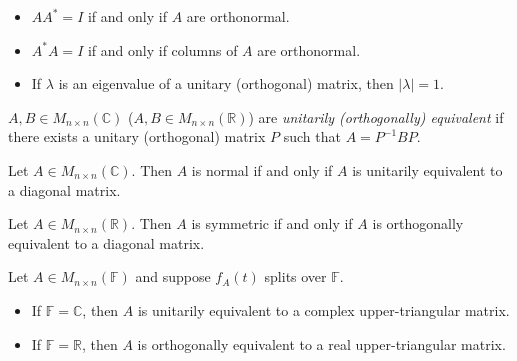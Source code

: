 \documentclass[12pt]{article}
\newenvironment{theorem}[2][Theorem]{\begin{trivlist}
\item[\hskip \labelsep {\bfseries #1}\hskip \labelsep {\bfseries #2.}]}{\end{trivlist}}
\newenvironment{definition}[2][Definition]{\begin{trivlist}
\item[\hskip \labelsep {\bfseries #1}\hskip \labelsep {\bfseries #2}]}{\end{trivlist}}
\begin{document}
\begin{itemize}
    \item $AA^* = I$ if and only if $A$ are orthonormal.
    
    \item $A^*A = I$ if and only if columns of $A$ are orthonormal. 
    
    \item If $\lambda$ is an eigenvalue of a unitary (orthogonal) matrix, then $\lvert \lambda \rvert = 1$.
\end{itemize}

\begin{definition}{11}
$A, B \in M_{n \times n}(\mathbb{C})$ ($A, B \in M_{n \times n}(\mathbb{R})$) are \textit{unitarily (orthogonally) equivalent} if there exists a unitary (orthogonal) matrix $P$ such that $A = P^{-1}BP$.
\end{definition}

\begin{theorem}{6.19}
Let $A \in M_{n \times n}(\mathbb{C})$. Then $A$ is normal if and only if $A$ is unitarily equivalent to a diagonal matrix. 
\end{theorem}

\begin{theorem}{6.20}
Let $A \in M_{n \times n}(\mathbb{R})$. Then $A$ is symmetric if and only if $A$ is orthogonally equivalent to a diagonal matrix.
\end{theorem}

\begin{theorem}{6.21 (Schur)}
Let $A \in M_{n \times n}(\mathbb{F})$ and suppose $f_A(t)$ splits over $\mathbb{F}$.

\begin{itemize}
    \item[(a)] If $\mathbb{F} = \mathbb{C}$, then $A$ is unitarily equivalent to a complex upper-triangular matrix.
    
    \item[(b)] If $\mathbb{F} = \mathbb{R}$, then $A$ is orthogonally equivalent to a real upper-triangular matrix.
\end{itemize}
\end{theorem}
\end{document}
